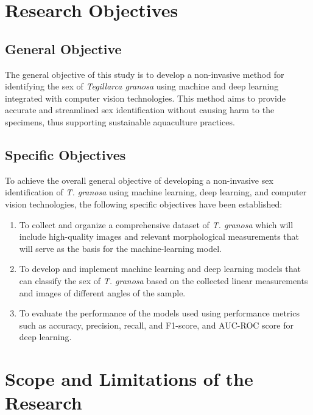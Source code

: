 \section{Research Objectives}
\label{sec:researchobjectives}

\subsection{General Objective}
\label{sec:generalobjective}

The general objective of this study is to develop a non-invasive method for identifying the sex of \textit{Tegillarca granosa} using machine and deep learning integrated with computer vision technologies. This method aims to provide accurate and streamlined sex identification without causing harm to the specimens, thus supporting sustainable aquaculture practices.

\subsection{Specific Objectives}
\label{sec:specificobjectives}

To achieve the overall general objective of developing a non-invasive sex identification of \textit{T. granosa} using machine learning, deep learning, and computer vision technologies, the following specific objectives have been established:  

\begin{enumerate}
   \item To collect and organize a comprehensive dataset of \textit{T. granosa} which will include high-quality images and relevant morphological measurements that will serve as the basis for the machine-learning model.
 
   \item To develop and implement machine learning and deep learning models that can classify the sex of \textit{T. granosa} based on the collected linear measurements and images of different angles of the sample.
   
   
   \item To evaluate the performance of the models used using performance metrics such as accuracy, precision, recall, and F1-score, and AUC-ROC score for deep learning. 
   
\end{enumerate}

\section{Scope and Limitations of the Research}
\label{sec:scopelimitations}

